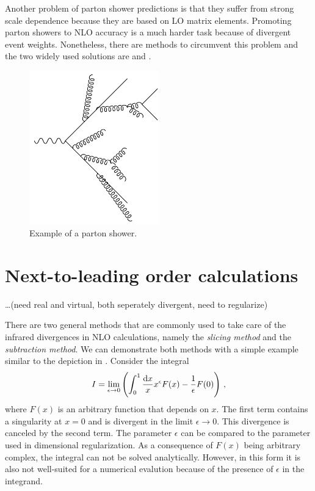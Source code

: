 Another problem of parton shower predictions is that they suffer from strong scale dependence because they are based on LO matrix elements.
Promoting parton showers to NLO accuracy is a much harder task because of divergent event weights.
Nonetheless, there are methods to circumvent this problem and the two widely used solutions are \mcatnlo{} \cite{mcatnlo} and \powheg{} \cite{powheg_a,powheg_b,powheg_c}.
%
\begin{figure}[]
	\includegraphics[width=0.5\textwidth]{images/partonshower.pdf}
	\caption{Example of a parton shower.}
	\label{fig:partonshower}
\end{figure}
%
%
\section{Next-to-leading order calculations}
\label{sec:nlo_calculations}
\ldots(need real and virtual, both seperately divergent, need to regularize)


There are two general methods that are commonly used to take care of the infrared divergences in NLO calculations, namely the \textit{slicing method} and the \textit{subtraction method}.
We can demonstrate both methods with a simple example similar to the depiction in \cite{slicing_vs_subtraction}.
Consider the integral
%
\begin{equation}
	I = \lim_{\epsilon \rightarrow 0} \left( \int_0^1 \frac{\dif x}{x} x^\epsilon F(x) - \frac{1}{\epsilon} F(0) \right) \, ,
\end{equation}
%
where $F(x)$ is an arbitrary function that depends on $x$.
The first term contains a singularity at $x=0$ and is divergent in the limit $\epsilon \rightarrow 0$.
This divergence is canceled by the second term.
The parameter $\epsilon$ can be compared to the parameter used in dimensional regularization.
As a consequence of $F(x)$ being arbitrary complex, the integral can not be solved analytically.
However, in this form it is also not well-suited for a numerical evalution because of the presence of $\epsilon$ in the integrand.

